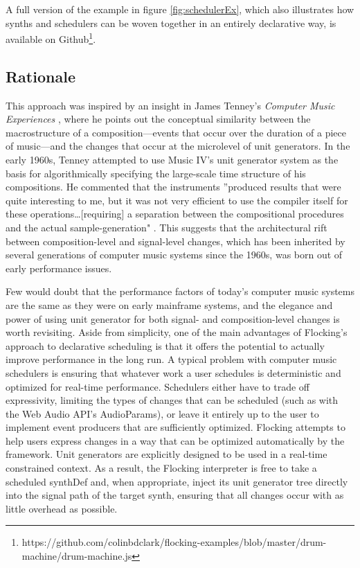 \documentclass{article}
\begin{document}
A full version of the example in figure \ref{fig:schedulerEx}, which also illustrates how synths and schedulers can be woven together in an entirely declarative way, is available on Github\footnote{https://github.com/colinbdclark/flocking-examples/blob/master/drum-machine/drum-machine.js}.

\subsection{Rationale}

This approach was inspired by an insight in James Tenney's {\it Computer Music Experiences} \cite{tenney1969computer}, where he points out the conceptual similarity between the macrostructure of a composition---events that occur over the duration of a piece of music---and the changes that occur at the microlevel of unit generators. In the early 1960s, Tenney attempted to use Music IV's unit generator system as the basis for algorithmically specifying the large-scale time structure of his compositions. He commented that the instruments ''produced results that were quite interesting to me, but it was not very efficient to use the compiler itself for these operations\ldots [requiring] a separation between the compositional procedures and the actual sample-generation" \cite[p.41--42]{tenney1969computer}. This suggests that the architectural rift between composition-level and signal-level changes, which has been inherited by several generations of computer music systems since the 1960s, was born out of early performance issues.

Few would doubt that the performance factors of today's computer music systems are the same as they were on early mainframe systems, and the elegance and power of using unit generator for both signal- and composition-level changes is worth revisiting. Aside from simplicity, one of the main advantages of Flocking's approach to declarative scheduling is that it offers the potential to actually improve performance in the long run. A typical problem with computer music schedulers is ensuring that whatever work a user schedules is deterministic and optimized for real-time performance. Schedulers either have to trade off expressivity, limiting the types of changes that can be scheduled (such as with the Web Audio API's AudioParams), or leave it entirely up to the user to implement event producers that are sufficiently optimized. Flocking attempts to help users express changes in a way that can be optimized automatically by the framework. Unit generators are explicitly designed to be used in a real-time constrained context. As a result, the Flocking interpreter is free to take a scheduled synthDef and, when appropriate, inject its unit generator tree directly into the signal path of the target synth, ensuring that all changes occur with as little overhead as possible.
\end{document}
